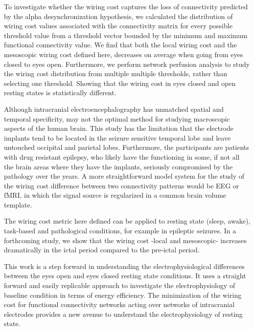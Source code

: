 \documentclass[11pt, onecolumn]{article}
\begin{document}
To investigate whether the wiring cost captures the loss of connectivity predicted by the alpha desynchronization hypothesis, we calculated the distribution of wiring cost values associated with the connectivity matrix for every possible threshold value from a threshold vector bounded by the minimum and maximum functional connectivity value.
We find that both the local wiring cost and the mesoscopic wiring cost defined here, decreases on average when going from eyes closed to eyes open. Furthermore, we perform network perfusion analysis to study the wiring cost distribution from multiple multiple thresholds, rather than selecting one threshold. Showing that the wiring cost in eyes closed and open resting states is statistically different. 

Although intracranial electroencephalography has unmatched spatial and temporal specificity, may not the optimal method for studying macroscopic aspects of the human brain. This study has the limitation that the electrode implants tend to be located in the seizure sensitive temporal lobe and leave untouched occipital and parietal lobes. Furthermore, the participants are patients with drug resistant epilepsy, who likely have the functioning in some, if not all the brain areas where they have the implants, seriously compromised by the pathology over the years. A more straightforward model system for the study of the wiring cost difference between two connectivity patterns would be EEG or fMRI, in which the signal source is regularized in a common brain volume template. 

The wiring cost metric here defined can be applied to resting state (sleep, awake), task-based and pathological conditions, for example in epileptic seizures. In a forthcoming study, we show that the wiring cost -local and mesoscopic- increases dramatically in the ictal period compared to the pre-ictal period.   

This work is a step forward in understanding the electrophysiological differences between the eyes open and eyes closed resting state conditions. It uses a straight forward and easily replicable approach to investigate the electrophysiology of baseline condition in terms of energy efficiency. The minimization of the wiring cost for functional connectivity networks acting over networks of intracranial electrodes provides a new avenue to understand the electrophysiology of resting state. 
\end{document}
